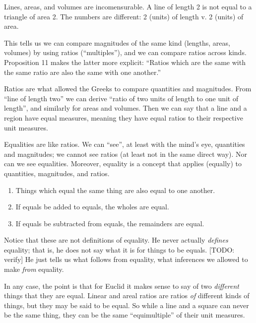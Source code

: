 Lines, areas, and volumes are incomensurable. A line of length 2 is
not equal to a triangle of area 2. The numbers are different: 2
(units) of length v. 2 (units) of area.


This tells us we can compare magnitudes of the same kind (lengths,
areas, volumes) by using ratios (``multiples''), and we can compare
ratios across kinds. Proposition 11 makes the latter more explicit:
\enquote{Ratios which are the same with the same ratio are also the
  same with one another.}

Ratios are what allowed the Greeks to compare quantities and
magnitudes. From ``line of length two'' we can derive ``ratio of two
units of length to one unit of length'', and similarly for areas and
volumes. Then we can say that a line and a region have equal measures,
meaning they have equal ratios to their respective unit measures.

Equalities are like ratios. We can ``see'', at least with the mind's
eye, quantities and magnitudes; we cannot see ratios (at least not in
the same direct way). Nor can we see equalities. Moreover, equality is
a concept that applies (equally) to quantities, magnitudes, and
ratios.

 \parencite{euclid}

\begin{enumerate}
\item Things which equal the same thing are also equal to one another.
\item If equals be added to equals, the wholes are equal.
\item If equals be subtracted from equals, the remainders are equal.
\end{enumerate}

Notice that these are not definitions of equality. He never actually
\textit{defines} equality; that is, he does not say what it is for
things to be equals. [TODO: verify] He just tells us what follows from
equality, what inferences we allowed to make \textit{from} equality.

In any case, the point is that for Euclid it makes sense to say of two
\textit{different} things that they are equal. Linear and areal ratios
are ratios \textit{of} different kinds of things, but they may be said
to be equal. So while a line and a square can never be the same thing,
they can be the same ``equimultiple'' of their unit measures.


